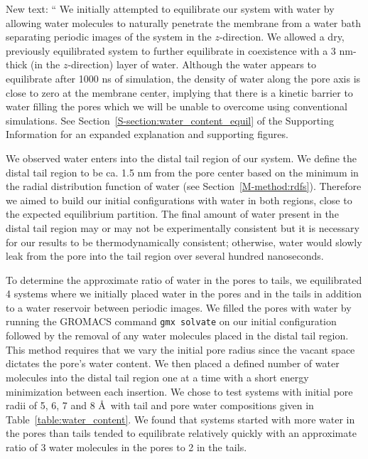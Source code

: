 \documentclass{article}
\begin{document}
\begin{enumerate}
    New text: `` We initially attempted to equilibrate our system with water by allowing water
	molecules to naturally penetrate the membrane from a water bath separating
	periodic images of the system in the $z$-direction. We allowed a dry, previously
	equilibrated system to further equilibrate in coexistence with a 3 nm-thick 
	(in the $z$-direction) layer of water. Although the water appears to equilibrate
	after 1000 ns of simulation, the density of water along the pore axis
	is close to zero at the membrane center, implying that there is a kinetic
	barrier to water filling the pores which we will be unable to overcome using
	conventional simulations. See Section~\ref{S-section:water_content_equil} 
        of the Supporting Information for an expanded explanation and supporting figures. 
	  
	We observed water enters into the distal tail region of our system. We define the 
	distal tail region to be ca. 1.5 nm from the pore center based on the minimum in 
	the radial distribution function of water (see Section~\ref{M-method:rdfs}). Therefore
	we aimed to build our initial configurations with water in both regions, close to
	the expected equilibrium partition. The final amount of water present in the distal
	tail region may or may not be experimentally consistent but it is necessary for our
	results to be thermodynamically consistent; otherwise, water would slowly leak 
	from the pore into the tail region over several hundred nanoseconds. 
	
	To determine the approximate ratio of water in the pores to tails, we equilibrated 4 systems
	where we initially placed water in the pores and in the tails in addition to a water
	reservoir between periodic images. We filled the pores with water by running the 
	GROMACS command \texttt{gmx solvate} on our initial configuration followed by the 
	removal of any water molecules placed in the distal tail region. This method requires
	that we vary the 
        initial pore radius since the vacant space dictates the pore's 
	water content. We then placed a defined number of water molecules into the distal tail
	region one at a time with a short energy minimization between each insertion.
	We chose to test systems with initial pore radii of 5, 6, 7 and 8 \AA~with tail and 
	pore water compositions given in Table~\ref{table:water_content}. We found that 
	systems started with more water in the pores than tails tended to equilibrate relatively
	quickly with an approximate ratio of 3 water molecules in the pores to 2 in the tails.


\end{enumerate}
\end{document}
